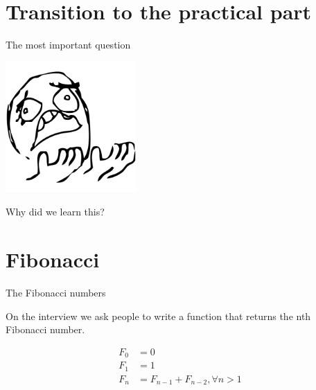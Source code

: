 \documentclass[presentation,aspectratio=169,smaller]{beamer}
\begin{document}
\section*{Transition to the practical part}
\label{sec:org6edef24}

\begin{frame}[label={sec:org54f7e2d}]{The most important question}
\pause

\begin{center}
\includegraphics[height=5cm]{images/whyyy.png}
\end{center}

Why did we learn this?
\end{frame}

\section*{Fibonacci}
\label{sec:orgf0fc9e3}

\begin{frame}[label={sec:orgf294c1e}]{The Fibonacci numbers}
\pause

On the interview we ask people to write a function that returns the nth
Fibonacci number.

\pause

\begin{align*}
  F_0 &= 0 \\
  F_1 &= 1 \\
  F_n &= F_{n - 1} + F_{n - 2}, \forall n > 1 \\
\end{align*}
\end{frame}
\end{document}
